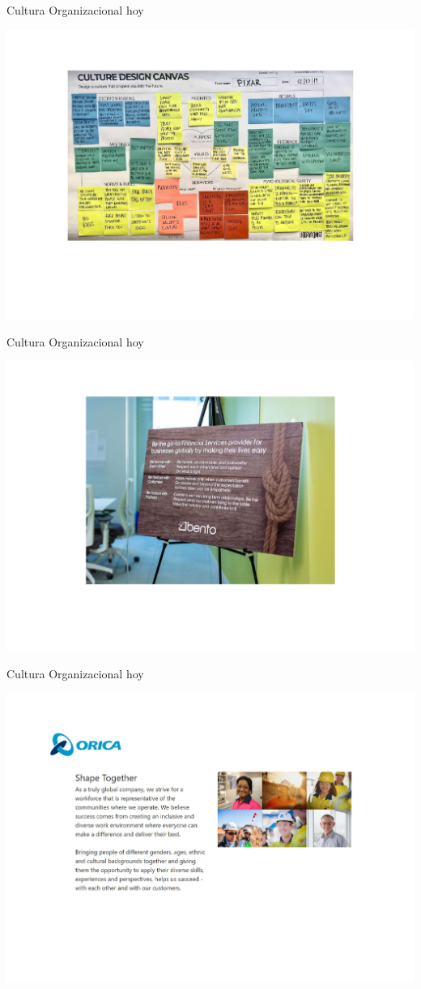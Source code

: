 \documentclass[aspectratio=169]{beamer}
\begin{document}
	\begin{frame}{Cultura Organizacional hoy}
		\begin{center}
			\includegraphics[height=\textheight]{./figures/L15.pdf}
		\end{center}
	\end{frame}

	\begin{frame}{Cultura Organizacional hoy}
		\begin{center}
			\includegraphics[height=\textheight]{./figures/L16.pdf}
		\end{center}
	\end{frame}

	\begin{frame}{Cultura Organizacional hoy}
		\begin{center}
			\includegraphics[height=\textheight]{./figures/L17.pdf}
		\end{center}
	\end{frame}
\end{document}
